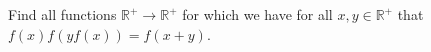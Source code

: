 Find all functions \(\mathbb{R}^+\rightarrow\mathbb{R}^+\) for which we have for all \(x,y\in \mathbb{R}^+\) that \(f(x)f(yf(x))=f(x+y)\).